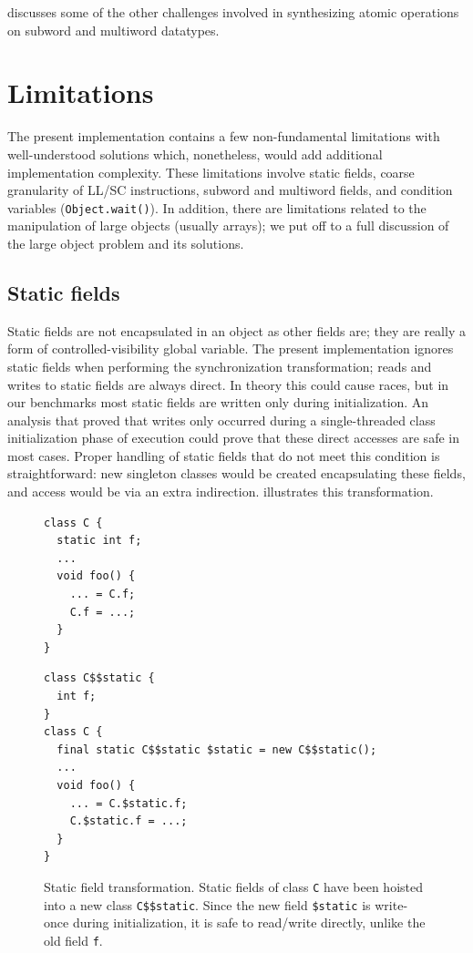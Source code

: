  discusses some of the other challenges involved in
synthesizing atomic operations on subword and multiword datatypes.

\section{Limitations}\label{sec:apex-limits}
The present \apex implementation contains a few non-fundamental
limitations with well-understood solutions which, nonetheless, would
add additional implementation complexity.  These limitations involve static
fields, coarse granularity of LL/SC instructions, subword and
multiword fields, and condition variables (\texttt{Object.wait()}).
In addition, there are
limitations related to the manipulation of large objects (usually
arrays); we put off to  a full discussion of the
large object problem and its solutions.

\subsection{Static fields}
Static fields are not encapsulated in an object as other fields are;
they are really a form of controlled-visibility global variable.  The
present implementation ignores static fields when performing the
synchronization transformation; reads and writes to static fields are
always direct.  In theory this could cause races, but in our
benchmarks most static fields are written only during initialization.
An analysis that proved that writes only occurred during a
single-threaded class initialization phase of execution could prove
that these direct accesses are safe in most cases.  Proper handling of
static fields that do not meet this condition is straightforward:
new singleton classes would be created encapsulating these fields, and
access would be via an extra indirection.  
illustrates this transformation.
\begin{figure}\sis\fontsize{9}{10}
\begin{minipage}[b]{1in}
\begin{verbatim}
class C {
  static int f;
  ...
  void foo() {
    ... = C.f;
    C.f = ...;
  }
}
\end{verbatim}
\end{minipage}
\raisebox{.4in}{$\quad\Rightarrow\quad$}
\begin{minipage}[b]{3in}
\begin{verbatim}
class C$$static {
  int f;
}
class C {
  final static C$$static $static = new C$$static();
  ...
  void foo() {
    ... = C.$static.f;
    C.$static.f = ...;
  }
}
\end{verbatim}
\end{minipage}%
\caption[Static field transformation.]
{Static field transformation.  Static fields of class \texttt{C} have
  been hoisted into a new class \texttt{C\$\$static}.  Since the new
  field \texttt{\$static} is write-once during initialization, it is
  safe to read/write directly, unlike the old field \texttt{f}.}
\label{fig:static-fields}
\end{figure}

